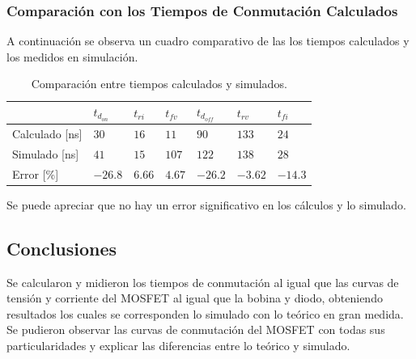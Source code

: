 \subsubsection{Comparación con los Tiempos de Conmutación Calculados}


A continuación se observa un cuadro comparativo de las los tiempos calculados y los medidos en simulación.
\begin{table}[H]
\centering
\begin{tabular}{@{}lllllll@{}}
\toprule
 & $t_{d_{on}}$ & $t_{ri}$ & $t_{fv}$ & $t_{d_{off}}$ & $t_{rv}$ & $t_{fi}$ \\ \midrule
Calculado [ns] & $30$ & $16$ & $11$ & $90$ & $133$ & $24$ \\
Simulado [ns] & $41$ & $15$ & $107$ & $122$ & $138$ & $28$ \\
Error [\%] & $-26.8$ & $6.66$ & $4.67$ & $-26.2$ & $-3.62$ & $-14.3$ \\ \bottomrule
\end{tabular}
\caption{Comparación entre tiempos calculados y simulados.}
\end{table}
Se puede apreciar que no hay un error significativo en los cálculos y lo simulado.

\subsection{Conclusiones}
Se calcularon y midieron los tiempos de conmutación al igual que las curvas de tensión y corriente del MOSFET al igual que la bobina y diodo, obteniendo resultados los cuales se corresponden lo simulado con lo teórico en gran medida. Se pudieron observar las curvas de conmutación del MOSFET con todas sus particularidades y explicar las diferencias entre lo teórico y simulado.
%
